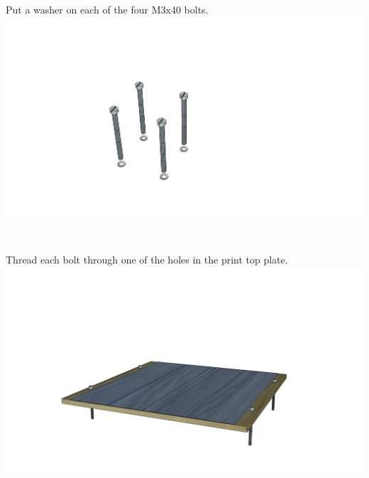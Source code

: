 \documentclass[twoside,a4paper,titlepage]{memoir}
\begin{document}
	\section{}
	Put a washer on each of the four M3x40 bolts.\\
	\includegraphics[width=1\linewidth]{graphics/ch11_2.png}
	
	\section{}
	Thread each bolt through one of the holes in the print top plate.\\
	\includegraphics[width=1\linewidth]{graphics/ch11_3.png}
	
\end{document}
